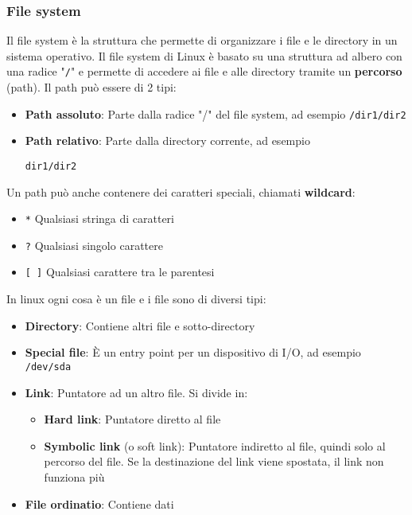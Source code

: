 \documentclass[a4paper]{article}
\begin{document}
\subsubsection{File system}
Il file system è la struttura che permette di organizzare i file e le directory in un
sistema operativo. Il file system di Linux è basato su una struttura ad albero con
una radice "\texttt{/}" e permette di accedere ai file e alle directory tramite un
\textbf{percorso} (path). Il path può essere di 2 tipi:
\begin{itemize}
  \item \textbf{Path assoluto}: Parte dalla radice "/" del file system, ad esempio
    \texttt{/dir1/dir2}

  \item \textbf{Path relativo}: Parte dalla directory corrente, ad esempio

    \texttt{dir1/dir2}
\end{itemize}

\vspace{1em}
\noindent
Un path può anche contenere dei caratteri speciali, chiamati \textbf{wildcard}:
\begin{itemize}
  \item \texttt{*} Qualsiasi stringa di caratteri
  \item \texttt{?} Qualsiasi singolo carattere
  \item \texttt{[ ]} Qualsiasi carattere tra le parentesi
\end{itemize}

\vspace{1em}
\noindent
In linux ogni cosa è un file e i file sono di diversi tipi:
\begin{itemize}
  \item \textbf{Directory}: Contiene altri file e sotto-directory
  \item \textbf{Special file}: È un entry point per un dispositivo di I/O, ad esempio
    \texttt{/dev/sda}
  \item \textbf{Link}: Puntatore ad un altro file. Si divide in:
    \begin{itemize}
      \item \textbf{Hard link}: Puntatore diretto al file
      \item \textbf{Symbolic link} (o soft link): Puntatore indiretto al file, quindi
        solo al percorso del file. Se la destinazione del link viene spostata, il link
        non funziona più
    \end{itemize}
  \item \textbf{File ordinatio}: Contiene dati
\end{itemize}
\end{document}

